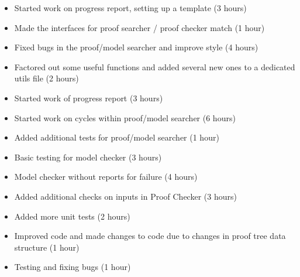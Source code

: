 %
{ \begin{itemize} 
 \item Started work on progress report, setting up a template (3 hours)
 \item Made the interfaces for proof searcher / proof checker match (1 hour)
 \item Fixed bugs in the proof/model searcher and improve style (4 hours)
 \item Factored out some useful functions and added several new ones to a
 dedicated utils file (2 hours)
 \end{itemize} 
}%
{ \begin{itemize} 
 \item Started work of progress report (3 hours)
 \item Started work on cycles within proof/model searcher (6 hours) 
 \item Added additional tests for proof/model searcher (1 hour)
 \end{itemize} 
}%
{ \begin{itemize} 
 \item Basic testing for model checker (3 hours)
 \item Model checker without reports for failure (4 hours)
 \end{itemize} 
}%
{ \begin{itemize} 
 \item Added additional checks on inputs in Proof Checker (3 hours)
 \item Added more unit tests (2 hours)
 \item Improved code and made changes to code due to changes in proof tree data structure (1 hour)
 \item Testing and fixing bugs (1 hour)
 \end{itemize} 
}%

